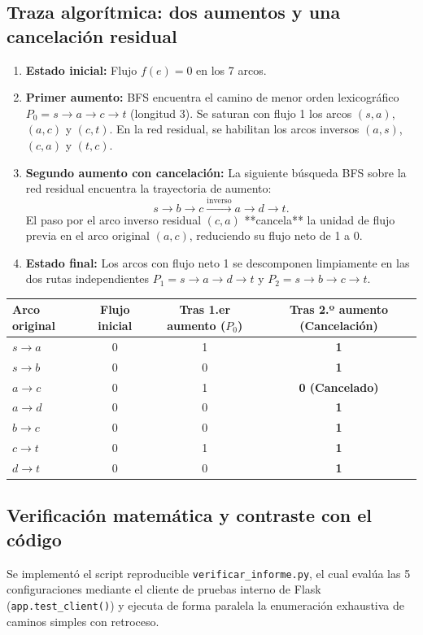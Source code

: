 \documentclass[11pt,a4paper]{article}
\newcommand{\tema}[1]{\subsection*{\color{verde}#1}}
\begin{document}
\tema{Traza algorítmica: dos aumentos y una cancelación residual}
\begin{enumerate}
  \item \textbf{Estado inicial:} Flujo $f(e) = 0$ en los 7 arcos.
  \item \textbf{Primer aumento:} BFS encuentra el camino de menor orden lexicográfico $P_0 = s \to a \to c \to t$ (longitud 3). Se saturan con flujo 1 los arcos $(s, a)$, $(a, c)$ y $(c, t)$. En la red residual, se habilitan los arcos inversos $(a, s)$, $(c, a)$ y $(t, c)$.
  \item \textbf{Segundo aumento con cancelación:} La siguiente búsqueda BFS sobre la red residual encuentra la trayectoria de aumento:
  \[
    s \longrightarrow b \longrightarrow c \stackrel{\text{inverso}}{\longrightarrow} a \longrightarrow d \longrightarrow t.
  \]
  El paso por el arco inverso residual $(c, a)$ **cancela** la unidad de flujo previa en el arco original $(a, c)$, reduciendo su flujo neto de 1 a 0.
  \item \textbf{Estado final:} Los arcos con flujo neto 1 se descomponen limpiamente en las dos rutas independientes $P_1 = s \to a \to d \to t$ y $P_2 = s \to b \to c \to t$.
\end{enumerate}

\begin{center}
{\small
\begin{tabular}{lccc}
\toprule
\textbf{Arco original} & \textbf{Flujo inicial} & \textbf{Tras 1.er aumento ($P_0$)} & \textbf{Tras 2.º aumento (Cancelación)} \\
\midrule
$s \to a$ & 0 & 1 & \textbf{1} \\
$s \to b$ & 0 & 0 & \textbf{1} \\
$a \to c$ & 0 & 1 & \textbf{\color{alerta}0 (Cancelado)} \\
$a \to d$ & 0 & 0 & \textbf{1} \\
$b \to c$ & 0 & 0 & \textbf{1} \\
$c \to t$ & 0 & 1 & \textbf{1} \\
$d \to t$ & 0 & 0 & \textbf{1} \\
\bottomrule
\end{tabular}}
\end{center}

\subsection{Verificación matemática y contraste con el código}
Se implementó el script reproducible \texttt{verificar\_informe.py}, el cual evalúa las 5 configuraciones mediante el cliente de pruebas interno de Flask (\texttt{app.test\_client()}) y ejecuta de forma paralela la enumeración exhaustiva de caminos simples con retroceso.
\end{document}
